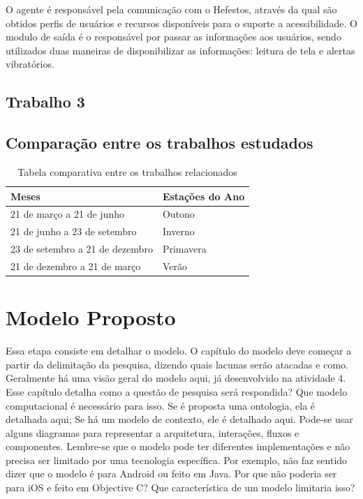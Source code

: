 \documentclass[english,brazilian]{UNISINOSmonografia}
\begin{document}
	O agente é responsável pela comunicação com o Hefestos, através da qual são obtidos perfis de usuários e recursos disponíveis para o suporte a acessibilidade. 
	O modulo de saída é o responsável por passar as informações aos usuários, sendo utilizados duas maneiras de disponibilizar as informações: leitura de tela e alertas vibratórios.



	\section{Trabalho 3}
	
	\section{Comparação entre os trabalhos estudados}\label{comparacaoTrabs}
\begin{table}
	\caption{Tabela comparativa entre os trabalhos relacionados}
	\centering%
	\begin{minipage}{.6\textwidth}
		\begin{tabular*}{\textwidth}{ll}
			\hline
			\textbf{Meses} & \textbf{Estações do Ano}\\
			\hline
			21 de março a 21 de junho & Outono\\
			21 de junho a 23 de setembro & Inverno\\
			23 de setembro a 21 de dezembro & Primavera\\
			21 de dezembro a 21 de março & Verão\\
			\hline
		\end{tabular*}
	\end{minipage}
\end{table}


\chapter{Modelo Proposto}
Essa etapa consiste em detalhar o modelo. O capítulo do modelo deve começar a partir da delimitação da pesquisa, dizendo quais lacunas serão atacadas e como. Geralmente há uma visão geral do modelo aqui, já desenvolvido na atividade 4. Esse capítulo detalha como a questão de pesquisa será respondida? Que modelo computacional é necessário para isso. Se é proposta uma ontologia, ela é detalhada aqui; Se há um modelo de contexto, ele é detalhado aqui. Pode-se usar alguns diagramas para representar a arquitetura, interações, fluxos e componentes. Lembre-se que o modelo pode ter diferentes implementações e não precisa ser limitado por uma tecnologia específica. Por exemplo, não faz sentido dizer que o modelo é para Android ou feito em Java. Por que não poderia ser para iOS e feito em Objective C? Que característica de um modelo limitaria isso?
\end{document}
